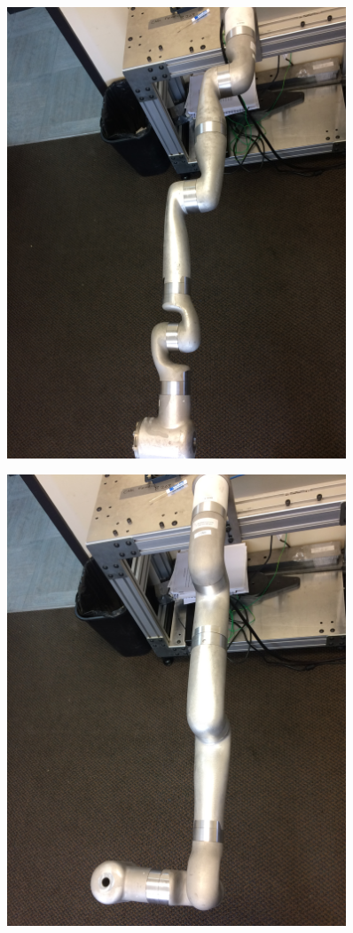 \begin{figure}
	\centering
	\begin{minipage}{.5\textwidth}
		\centering
		\includegraphics[width=0.9\textwidth]{./images/Pose12}
		\label{fig:pose12}
	\end{minipage}%
	\begin{minipage}{.5\textwidth}
		\centering
		\includegraphics[width=0.9\textwidth]{./images/Pose13}

\end{minipage}
\end{figure}
